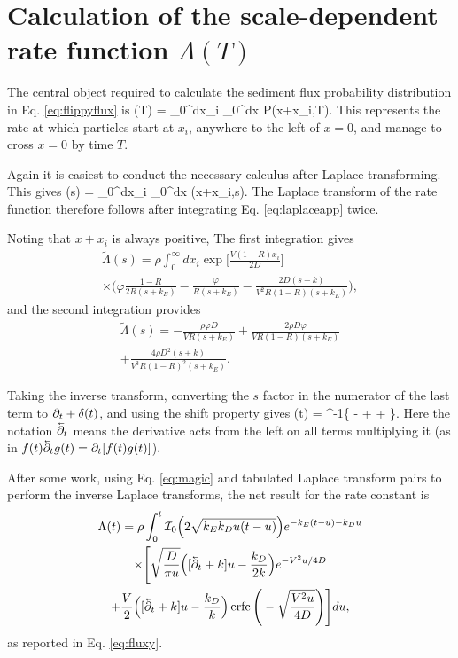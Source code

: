 \section{Calculation of the scale-dependent rate function $\Lambda(T)$}
\label{sec:fluxconstant}
The central object required to calculate the sediment flux probability distribution in Eq. \ref{eq:flippyflux} is 
\be \Lambda(T) = \rho \int_0^\infty dx_i \int_0^\infty dx P(x+x_i,T).\ee
This represents the rate at which particles start at $x_i$, anywhere to the left of $x=0$, and manage to cross $x=0$ by time $T$.

Again it is easiest to conduct the necessary calculus after Laplace transforming. This gives 
\be \tilde{\Lambda}(s) = \rho \int_0^\infty dx_i \int_0^\infty dx (x+x_i,s).\ee
The Laplace transform of the rate function therefore follows after integrating Eq. \ref{eq:laplaceapp} twice.

Noting that $x+x_i$ is always positive,
The first integration gives
\begin{multline} \tilde{\Lambda}(s) = \rho \int_0^\infty dx_i \exp\Big[\frac{V(1-R)x_i}{2D}\Big]\\ 
	\times\Big(\varphi \frac{1-R}{2R(s+k_E)} - \frac{\varphi}{R(s+k_E)} - \frac{2D(s+k)}{V^2R(1-R)(s+k_E)}\Big), \end{multline}
and the second integration provides
\begin{multline}  \tilde{\Lambda}(s) = -\frac{\rho \varphi D}{V R(s+k_E)}  + \frac{2\rho D\varphi}{VR(1-R)(s+k_E)} \\ + \frac{4\rho D^2(s+k)}{V^3R(1-R)^2(s+k_E)}. 
	\label{eq:laplacefluxrate}\end{multline}

Taking the inverse transform, converting the $s$ factor in the numerator of the last term to $\partial_t + \delta(t)$, and using the shift property gives \citep[e.g.][]{Arfken1985}
\be \Lambda(t) = \rho {}^{-1}\Bigg\{ -  +  + \Bigg\}.\ee
Here the notation $\cev{\pt}$ means the derivative acts from the left on all terms multiplying it (as in $f(t)\cev{\pt} g(t) = \pt [f(t)g(t)]$).

After some work, using Eq. \ref{eq:magic} and tabulated Laplace transform pairs \citep[e.g.][]{Arfken1985,Prudnikov1992a} to perform the inverse Laplace transforms, the net result for the rate constant is
\begin{multline} 
	\Lambda(t) = \rho \int_0^t \mathcal{I}_0\Big(2\sqrt{k_Ek_Du(t-u)}\Big)e^{-k_E(t-u)-k_D u} \\
	\times \Bigg[\sqrt{\frac{D}{\pi u}}\Big([\cev{\partial_t} + k]u-\frac{k_D}{2 k}\Big)e^{-V^2 u/4D}  \\ + \frac{V}{2}\Big([\cev{\partial_t} + k]u -\frac{k_D}{k}\Big) \erfc\Bigg(-\sqrt{\frac{V^2 u}{4D}}\Bigg)\Bigg] du,
\end{multline}
as reported in Eq. \ref{eq:fluxy}.

